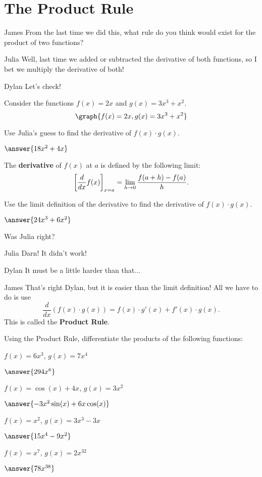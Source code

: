 \documentclass{ximera}
\begin{document}
\section{The Product Rule}
\begin{dialogue}
\item[James] From the last time we did this, what rule do you think would exist for the product of two functions?
\item[Julia] Well, last time we added or subtracted the derivative of both functions, so I bet we multiply the derivative of both!
\item[Dylan] Let's check!
\end{dialogue}
Consider the functions $f(x) = 2x$ and $g(x) = 3x^3 + x^2$.
\[
\graph{f(x)=2x, g(x)=3x^3+x^2}
\]
\begin{question}
Use Julia's guess to find the derivative of $f(x) \cdot g(x)$.

$\answer{18x^2+4x}$

\begin{definition}
  The \textbf{derivative} of $f(x)$ at $a$ is defined by the following limit:
  \[
  \bigg[ \frac{d}{dx} f(x) \bigg]_{x=a} = \lim_{h\to 0} \frac{f(a+h) - f(a)}{h}.
  \]
\end{definition}

Use the limit definition of the derivative to find the derivative of $f(x) \cdot g(x)$.

$\answer{24x^3+6x^2}$

Was Julia right?
\begin{multipleChoice}
\end{multipleChoice}
\end{question}
\begin{dialogue}
\item[Julia] Darn! It didn't work!
\item[Dylan] It must be a little harder than that...
\item[James] That's right Dylan, but it is easier than the limit definition! All we have to do is use $$\frac{d}{dx}\left(f(x)\cdot g(x)\right)= f(x)\cdot g'(x) + f'(x)\cdot g(x)\text{.}$$ This is called the \textbf{Product Rule}.
\end{dialogue}
\begin{question}
Using the Product Rule, differentiate the products of the following functions:

$f(x) = 6x^3$, $g(x) = 7x^4$

$\answer{294x^6}$

$f(x) = \cos(x)+4x$, $g(x) = 3x^2$

$\answer{-3x^2\sin(x)+6x\cos(x)}$

$f(x) = x^2$, $g(x) = 3x^3-3x$

$\answer{15x^4-9x^2}$

$f(x) = x^7$, $g(x) = 2x^{32}$

$\answer{78x^{38}}$

\end{question}
\end{document}
